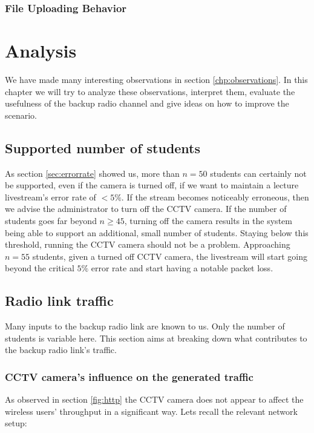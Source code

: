 \documentclass[a4paper]{scrreprt}
\begin{document}
		\subsection{File Uploading Behavior}\label{sec:ftp}		
			
		
	\chapter{Analysis}\label{sec:analysis}
		We have made many interesting observations in section \ref{chp:observations}. In this chapter we will try to analyze these observations, interpret them, evaluate the usefulness of the backup radio channel and give ideas on how to improve the scenario.				
		
		\section{Supported number of students}
		As section \ref{sec:errorrate} showed us, more than $n=50$ students can certainly not be supported, even if the camera is turned off, if we want to maintain a lecture livestream's error rate of $<5\%$. If the stream becomes noticeably erroneous, then we advise the administrator to turn off the CCTV camera. If the number of students goes far beyond $n\geq 45$, turning off the camera results in the system being able to support an additional, small number of students. Staying below this threshold, running the CCTV camera should not be a problem. Approaching $n=55$ students, given a turned off CCTV camera, the livestream will start going beyond the critical $5\%$ error rate and start having a notable packet loss.	
		
		\section{Radio link traffic}
		Many inputs to the backup radio link are known to us. Only the number of students is variable here. This section aims at breaking down what contributes to the backup radio link's traffic.
		
			\subsection{CCTV camera's influence on the generated traffic}\label{sec:cctvinfluence}
			As observed in section \ref{fig:http} the CCTV camera does not appear to affect the wireless users' throughput in a significant way. Lets recall the relevant network setup:
			
\end{document}
